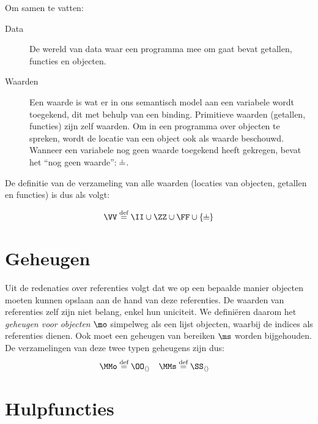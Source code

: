 Om samen te vatten:
\begin{description}
  \item[Data] De wereld van data waar een programma mee om gaat bevat getallen, functies en objecten.
  \item[Waarden] Een waarde is wat er in ons semantisch model aan een variabele wordt toegekend, dit met behulp van een binding. Primitieve waarden (getallen, functies) zijn zelf waarden. Om in een programma over objecten te spreken, wordt de locatie van een object ook als waarde beschouwd. Wanneer een variabele nog geen waarde toegekend heeft gekregen, bevat het “nog geen waarde”: $\nil$.
\end{description}

De definitie van de verzameling van alle waarden (locaties van objecten, getallen en functies) is dus als volgt:

\begin{equation*}
  \VV \DEF \II \cup \ZZ \cup \FF \cup \{\nil\}
\end{equation*}

\section{Geheugen}
\label{sec:locaties}

Uit de redenaties over referenties volgt dat we op een bepaalde manier objecten moeten kunnen opslaan aan de hand van deze referenties. De waarden van referenties zelf zijn niet belang, enkel hun uniciteit. We definiëren daarom het \emph{geheugen voor objecten} $\mo$ simpelweg als een lijst objecten, waarbij de indices als referenties dienen. Ook moet een geheugen van bereiken $\ms$ worden bijgehouden. De verzamelingen van deze twee typen geheugens zijn dus:
%
\begin{align*}
  \MMo &\DEF \OO_{\langle\rangle} &
  \MMs &\DEF \SS_{\langle\rangle}
\end{align*}

\section{Hulpfuncties}
\label{sec:hulpfuncties}

